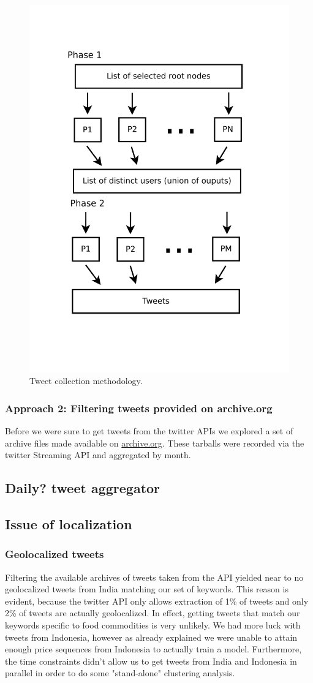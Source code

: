 \begin{figure}
\includegraphics[width=.7\textwidth]{./img/CollectionProcess.pdf}
\caption{Tweet collection methodology.}
\label{fig:methodology}
\end{figure}

\subsubsection*{Approach 2: Filtering tweets provided on archive.org}
Before we were sure to get tweets from the twitter APIs we explored a set of archive files made available on \href{https://archive.org/details/twitterstream}{archive.org}. These tarballs were recorded via the twitter Streaming API and aggregated by month.

\subsection*{Daily? tweet aggregator}


\subsection*{Issue of localization}
\subsubsection*{Geolocalized tweets}
Filtering the available archives of tweets taken from the API yielded near to no geolocalized tweets from India matching our set of keywords. This reason is evident, because the twitter API only allows extraction of 1\% of tweets and only 2\% of tweets are actually geolocalized. In effect, getting tweets that match our keywords specific to food commodities is very unlikely. We had more luck with tweets from Indonesia, however as already explained we were unable to attain enough price sequences from Indonesia to actually train a model. Furthermore, the time constraints didn't allow us to get tweets from India and Indonesia in parallel in order to do some "stand-alone" clustering analysis.
